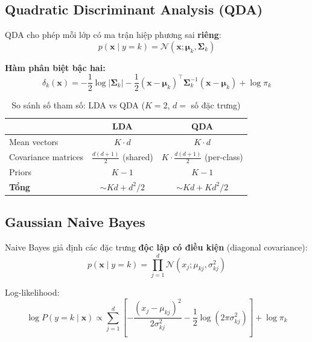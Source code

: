 \documentclass[12pt, a4paper]{article}
\begin{document}

\subsection{Quadratic Discriminant Analysis (QDA)}
\label{ssec:qda}

QDA cho phép mỗi lớp có ma trận hiệp phương sai \textbf{riêng}:
$$p(\mathbf{x} \mid y=k) = \mathcal{N}(\mathbf{x}; \boldsymbol{\mu}_k, \boldsymbol{\Sigma}_k)$$

\textbf{Hàm phân biệt bậc hai:}
$$\delta_k(\mathbf{x}) = -\frac{1}{2}\log|\boldsymbol{\Sigma}_k| - \frac{1}{2}(\mathbf{x}-\boldsymbol{\mu}_k)^\top \boldsymbol{\Sigma}_k^{-1}(\mathbf{x}-\boldsymbol{\mu}_k) + \log\pi_k$$

\begin{table}[H]
  \centering
  \caption{So sánh số tham số: LDA vs QDA ($K=2$, $d=$ số đặc trưng)}
  \begin{tabular}{lcc}
    \toprule
    & \textbf{LDA} & \textbf{QDA} \\
    \midrule
    Mean vectors & $K \cdot d$ & $K \cdot d$ \\
    Covariance matrices & $\frac{d(d+1)}{2}$ (shared) & $K \cdot \frac{d(d+1)}{2}$ (per-class) \\
    Priors & $K-1$ & $K-1$ \\
    \midrule
    \textbf{Tổng} & $\sim Kd + d^2/2$ & $\sim Kd + Kd^2/2$ \\
    \bottomrule
  \end{tabular}
\end{table}


\subsection{Gaussian Naive Bayes}
\label{ssec:gnb}

Naive Bayes giả định các đặc trưng \textbf{độc lập có điều kiện} (diagonal covariance):
$$p(\mathbf{x} \mid y=k) = \prod_{j=1}^{d} \mathcal{N}(x_j; \mu_{kj}, \sigma_{kj}^2)$$

Log-likelihood:
$$\log P(y=k \mid \mathbf{x}) \propto \sum_{j=1}^{d} \left[-\frac{(x_j - \mu_{kj})^2}{2\sigma_{kj}^2} - \frac{1}{2}\log(2\pi\sigma_{kj}^2)\right] + \log\pi_k$$

\end{document}

